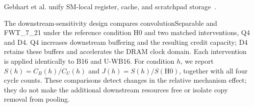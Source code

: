 Gebhart et al. unify SM-local register, cache, and scratchpad storage~\cite{unified}.

The downstream-sensitivity design compares convolutionSeparable and FWT\_7\_21 under the reference condition H0 and two matched interventions, Q4 and D4. Q4 increases downstream buffering and the resulting credit capacity; D4 retains these buffers and accelerates the DRAM clock domain. Each intervention is applied identically to B16 and U-WB16. For condition $h$, we report $S(h)=C_B(h)/C_U(h)$ and $J(h)=S(h)/S(\mathrm{H0})$, together with all four cycle counts. These comparisons detect changes in the relative mechanism effect; they do not make the additional downstream resources free or isolate copy removal from pooling.

